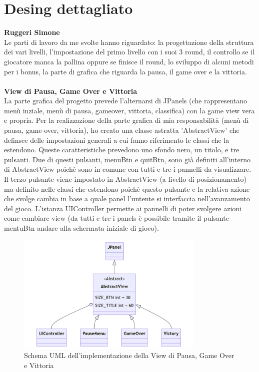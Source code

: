 \documentclass[a4paper,12pt]{report}
\begin{document}
\section{Desing dettagliato}
\textbf{Ruggeri Simone}\\
Le parti di lavoro da me svolte hanno riguardato: la progettazione della struttura dei vari livelli,
l'impostazione del primo livello con i suoi 3 round, il controllo se il giocatore manca la pallina oppure se finisce il round, lo sviluppo di
alcuni metodi per i bonus, la parte di grafica che riguarda la pausa, il game over e la vittoria.\\\\
\textbf{View di Pausa, Game Over e Vittoria}\\
La parte grafica del progetto prevede l'alternarsi di JPanels (che rappresentano menù inziale, menù di pausa, gameover, vittoria, classifica)
con la game view vera e propria.
Per la realizzazione della parte grafica di mia responsabilità (menù di pausa, game-over, vittoria), ho creato una classe astratta 'AbstractView'
che definsce delle impostazioni generali a cui fanno riferimento le classi che la estendono.
Queste caratteristiche prevedono uno sfondo nero, un titolo, e tre pulsanti. Due di questi pulsanti, menuBtn e quitBtn,
sono già definiti all'interno di AbstractView poichè sono in comune con tutti e tre i pannelli da visualizzare.
Il terzo pulsante viene impostato in AbstractView (a livello di posizionamento) ma definito nelle classi che estendono poichè questo pulsante e la
relativa azione che svolge cambia in base a quale panel l'untente si interfaccia nell'avanzamento del gioco.
L'istanza UIController permette ai pannelli di poter svolgere azioni come cambiare view (da tutti e tre i panels è possibile tramite il pulsante
mentuBtn andare alla schermata iniziale di gioco).
\begin{figure}[H]
  \centering
  \includegraphics[width=0.8\textwidth]{images/AbstractView.png}
  \caption{Schema UML dell'implementazione della View di Pausa, Game Over e Vittoria}
\end{figure}
\pagebreak
\end{document}
